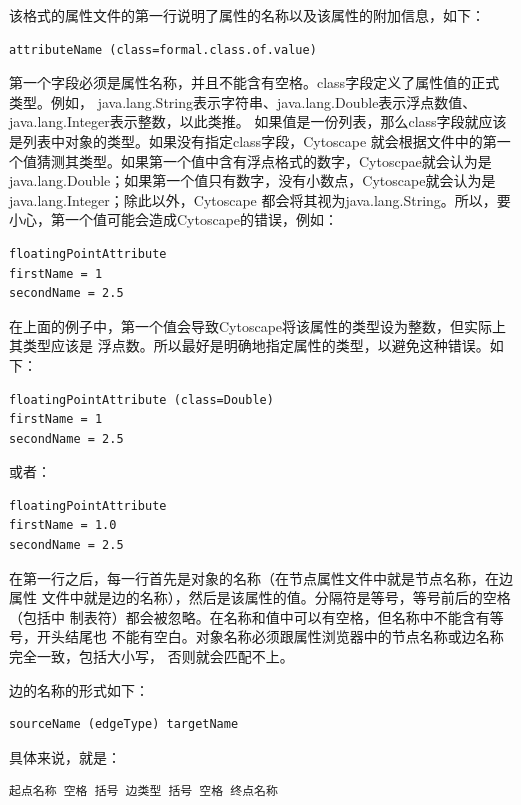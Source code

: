 该格式的属性文件的第一行说明了属性的名称以及该属性的附加信息，如下：

\begin{verbatim}
attributeName (class=formal.class.of.value)
\end{verbatim}

第一个字段必须是属性名称，并且不能含有空格。class字段定义了属性值的正式类型。例如，
java.lang.String表示字符串、java.lang.Double表示浮点数值、java.lang.Integer表示整数，以此类推。
如果值是一份列表，那么class字段就应该是列表中对象的类型。如果没有指定class字段，Cytoscape
就会根据文件中的第一个值猜测其类型。如果第一个值中含有浮点格式的数字，Cytoscpae就会认为是
java.lang.Double；如果第一个值只有数字，没有小数点，Cytoscape就会认为是java.lang.Integer；除此以外，Cytoscape
都会将其视为java.lang.String。所以，要小心，第一个值可能会造成Cytoscape的错误，例如：

 \begin{verbatim}
floatingPointAttribute
firstName = 1
secondName = 2.5
\end{verbatim}

在上面的例子中，第一个值会导致Cytoscape将该属性的类型设为整数，但实际上其类型应该是
浮点数。所以最好是明确地指定属性的类型，以避免这种错误。如下：

 \begin{verbatim}
floatingPointAttribute (class=Double)
firstName = 1
secondName = 2.5
\end{verbatim}

或者：

 \begin{verbatim}
floatingPointAttribute 
firstName = 1.0
secondName = 2.5
\end{verbatim}

在第一行之后，每一行首先是对象的名称（在节点属性文件中就是节点名称，在边属性
文件中就是边的名称），然后是该属性的值。分隔符是等号，等号前后的空格（包括中
制表符）都会被忽略。在名称和值中可以有空格，但名称中不能含有等号，开头结尾也
不能有空白。对象名称必须跟属性浏览器中的节点名称或边名称完全一致，包括大小写，
否则就会匹配不上。

边的名称的形式如下：

\begin{verbatim}
sourceName (edgeType) targetName
\end{verbatim}

具体来说，就是： 

\begin{verbatim}
起点名称 空格 括号 边类型 括号 空格 终点名称
\end{verbatim}

